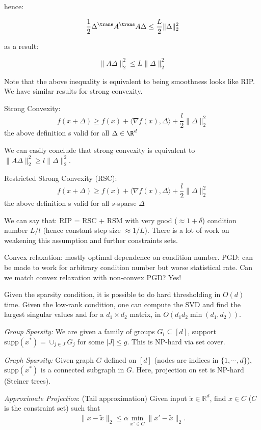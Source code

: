 hence:

$$\frac{1}{2}\Delta^{\trans} A^{\trans} A \Delta \leq \frac{L}{2}\|\Delta\|_2^2$$

as a result:

$$\|A\Delta \|_2^2 \leq L\|\Delta\|_2^2$$

Note that the above inequality is equivalent to being smoothness looks like RIP.
We have similar results for strong convexity.
\begin{definition}
Strong Convexity:
$$f(x+\Delta) \geq f(x) + \langle \nabla f(x), \Delta \rangle + \frac{l}{2} \| \Delta\|_2^2 $$
the above definition s valid for all $\Delta \in \R^d$  
\end{definition}
We can easily conclude that strong convexity is equivalent to $\|A\Delta \|_2^2 \geq l\|\Delta\|_2^2$.

\begin{definition}
Restricted Strong Convexity (RSC):
$$f(x+\Delta) \geq f(x) + \langle \nabla f(x), \Delta \rangle + \frac{l}{2} \| \Delta\|_2^2 $$
the above definition s valid for all $s$-sparse $\Delta$  
\end{definition}
We can say that:
RIP = RSC + RSM with very good ($\approx 1 + \delta$) condition number $L/l$ (hence constant step size $\approx 1/L$).
There is a lot of work on weakening this assumption and further constraints sets.

Convex relaxation: mostly optimal dependence on condition number.
PGD: can be made to work for arbitrary condition number but worse statistical rate.
Can we match convex relaxation with non-convex PGD? Yes!

Given the sparsity condition, it is possible to do hard thresholding in $O(d)$ time. Given the low-rank condition, one can compute the SVD and find the largest singular values and for a $d_1 \times d_2$ matrix, in $O(d_1 d_2 \min( d_1, d_2)).$


\emph{Group Sparsity:}
We are given a family of groups $G_i \subseteq [d]$, support $\text{supp}(x^*) = \cup_{j \in J} G_j$ for some $|J| \leq g.$ This is NP-hard via set cover. 


\emph{Graph Sparsity:}
Given graph $G$ defined on $[d]$ (nodes are indices in $\{ 1, \cdots, d\}$), $\text{supp}(x^*)$ is a connected subgraph in $G$. Here, projection on set is NP-hard (Steiner trees). 


\emph{Approximate Projection}:
(Tail approximation) Given input $\tilde{x} \in \mathbb{R}^d$, find $x \in C$ ($C$ is the constraint set) such that 
\begin{align*}
\|x - \tilde{x} \|_2 \leq \alpha \min_{x' \in C} \| x'- \tilde{x} \|_2. 
\end{align*}

